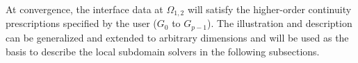 \documentclass[conference]{IEEEtran}
\newcommand{\eqt}[1]{Equation~(\ref{#1})}
\begin{document}

At convergence, the interface data at $\Omega_{1,2}$ will satisfy the higher-order continuity prescriptions specified by the user ($G_0$ to $G_{p-1}$). The illustration and description can be generalized and extended to arbitrary dimensions and will be used as the basis to describe the local subdomain solvers in the following subsections.

%
%
%
%
\end{document}
